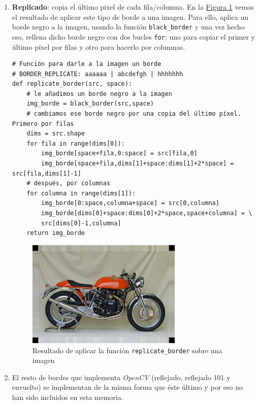 \documentclass[11pt,a4paper]{article}
\theoremstyle{plain}
\theoremstyle{definition}
\begin{document}
\begin{enumerate}[$\qquad\bullet$]
\item \textbf{Replicado}: copia el último pixel de cada fila/columna. En la \hyperref[replicate]{Figura \ref*{replicate}} vemos el resultado de aplicar este tipo de borde a una imagen. Para ello, aplica un borde negro a la imagen, usando la función \texttt{black\_border} y una vez hecho eso, rellena dicho borde negro con dos bucles \texttt{for}: uno para copiar el primer y último píxel por filas y otro para hacerlo por columnas.

\begin{verbatim}
# Función para darle a la imagen un borde 
# BORDER_REPLICATE: aaaaaa | abcdefgh | hhhhhhh
def replicate_border(src, space):
    # le añadimos un borde negro a la imagen
    img_borde = black_border(src,space)
    # cambiamos ese borde negro por una copia del último píxel. Primero por filas
    dims = src.shape
    for fila in range(dims[0]):
        img_borde[space+fila,0:space] = src[fila,0]
        img_borde[space+fila,dims[1]+space:dims[1]+2*space] = src[fila,dims[1]-1]
    # después, por columnas
    for columna in range(dims[1]):
        img_borde[0:space,columna+space] = src[0,columna]
        img_borde[dims[0]+space:dims[0]+2*space,space+columna] = \
        src[dims[0]-1,columna]
    return img_borde
\end{verbatim}

\begin{figure}[!h]
    \centering
    \includegraphics[width=0.7\textwidth]{borde_replicado}
    \caption{Resultado de aplicar la función \texttt{replicate\_border} sobre una imagen}
    \label{replicate}
\end{figure}

\item El resto de bordes que implementa \textit{OpenCV} (reflejado, reflejado 101 y envuelto) se implementan de la misma forma que éste último y por eso no han sido incluidos en esta memoria.

\end{enumerate}
\end{document}
